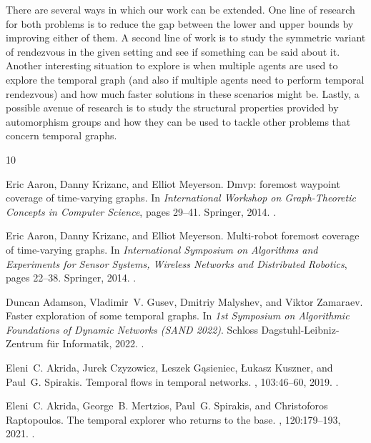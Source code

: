 \documentclass[10pt,a4paper]{article}
\begin{document}
There are several ways in which our work can be extended. One line of research
for both problems is to reduce the gap between the lower and upper bounds by
improving either of them. A second line of work is to study the symmetric variant
of rendezvous in the given setting and see if something can be said about it. Another
interesting situation to explore is when multiple agents are used to explore the
temporal graph (and also if multiple agents need to perform temporal rendezvous)
and how much faster solutions in these scenarios might be.
Lastly, a possible avenue of research is to study the structural properties
provided by automorphism groups and how they can be used to tackle other problems
that concern temporal graphs.
\begin{thebibliography}{10}

Eric Aaron, Danny Krizanc, and Elliot Meyerson.
\newblock Dmvp: foremost waypoint coverage of time-varying graphs.
\newblock In {\em International Workshop on Graph-Theoretic Concepts in
  Computer Science}, pages 29--41. Springer, 2014.
\newblock \href {https://doi.org/10.1007/978-3-319-12340-0_3}
  {}.

Eric Aaron, Danny Krizanc, and Elliot Meyerson.
\newblock Multi-robot foremost coverage of time-varying graphs.
\newblock In {\em International Symposium on Algorithms and Experiments for
  Sensor Systems, Wireless Networks and Distributed Robotics}, pages 22--38.
  Springer, 2014.
\newblock \href {https://doi.org/10.1007/978-3-662-46018-4_2}
  {}.

Duncan Adamson, Vladimir~V. Gusev, Dmitriy Malyshev, and Viktor Zamaraev.
\newblock Faster exploration of some temporal graphs.
\newblock In {\em 1st Symposium on Algorithmic Foundations of Dynamic Networks
  (SAND 2022)}. Schloss Dagstuhl-Leibniz-Zentrum f{\"u}r Informatik, 2022.
\newblock \href {https://doi.org/10.4230/LIPIcs.SAND.2022.5}
  {}.

Eleni~C. Akrida, Jurek Czyzowicz, Leszek G{\k a}sieniec, {\L}ukasz Kuszner, and
  Paul~G. Spirakis.
\newblock Temporal flows in temporal networks.
, 103:46--60, 2019.
\newblock \href {https://doi.org/10.1016/j.jcss.2019.02.003}
  {}.

Eleni~C. Akrida, George~B. Mertzios, Paul~G. Spirakis, and Christoforos
  Raptopoulos.
\newblock The temporal explorer who returns to the base.
, 120:179--193, 2021.
\newblock \href {https://doi.org/10.1016/j.jcss.2021.04.001}
  {}.


\end{thebibliography}
\end{document}
